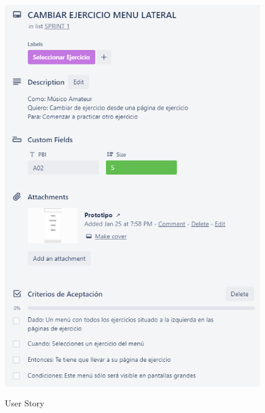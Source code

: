 \documentclass[12pt,twoside,titlepage]{report}
\begin{document}
\begin{figure}[H]
    \centering
    \includegraphics[scale=1.3]{Scrum/User Stories/MenuLateral}
    \label{fig:MenuLateral}
    \caption{User Story}
\end{figure}
\end{document}
